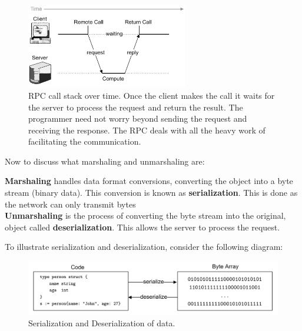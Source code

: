 \begin{figure}[h]
    \centering
    \includegraphics[width=0.63\textwidth]{Sections/rpc/call_time.png}
    
    \vspace{1em}
    \caption{RPC call stack over time. Once the client makes the call it waits for the server to process the request and return the result. The programmer need not worry beyond sending the request and receiving the response.
    The RPC deals with all the heavy work of facilitating the communication.
    }
    \label{fig:rpc_time}
\end{figure}

\newpage 

\noindent
Now to discuss what marshaling and unmarshaling are:
\begin{Def}

    \textbf{Marshaling} handles data format conversions, converting the object into a byte stream (binary data).
    This conversion is known as \textbf{serialization}. This is done as the network can only transmit bytes\\
    
    \noindent
    \textbf{Unmarshaling} is the process of converting the byte stream into the original, object called \textbf{deserialization}. 
    This allows the server to process the request.
\end{Def}

\noindent
To illustrate serialization and deserialization, consider the following diagram:
\begin{figure}[h]
    \centering
    \includegraphics[width=1\textwidth]{Sections/rpc/ser.png}
    \caption{Serialization and Deserialization of data.}
    \label{fig:ser_deser}
\end{figure}

